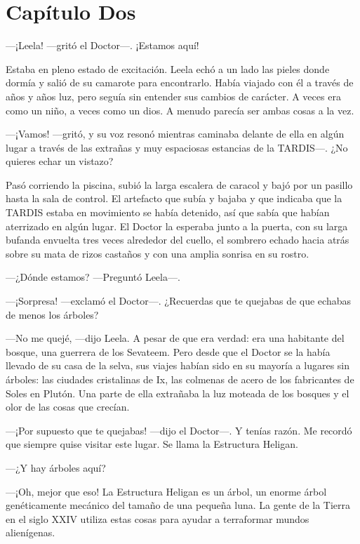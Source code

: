 \chapter*{Capítulo Dos}

---¡Leela! ---gritó el Doctor---. ¡Estamos aquí!

Estaba en pleno estado de excitación. Leela echó a un lado las pieles
donde dormía y salió de su camarote para encontrarlo. Había viajado con
él a través de años y años luz, pero seguía sin entender sus cambios de
carácter. A veces era como un niño, a veces como un dios. A menudo
parecía ser ambas cosas a la vez.

---¡Vamos! ---gritó, y su voz resonó mientras caminaba delante de ella
en algún lugar a través de las extrañas y muy espaciosas estancias de la
TARDIS---. ¿No quieres echar un vistazo?

Pasó corriendo la piscina, subió la larga escalera de caracol y bajó por
un pasillo hasta la sala de control. El artefacto que subía y bajaba y
que indicaba que la TARDIS estaba en movimiento se había detenido, así
que sabía que habían aterrizado en algún lugar. El Doctor la esperaba
junto a la puerta, con su larga bufanda envuelta tres veces alrededor
del cuello, el sombrero echado hacia atrás sobre su mata de rizos
castaños y con una amplia sonrisa en su rostro.

---¿Dónde estamos? ---Preguntó Leela---.

---¡Sorpresa! ---exclamó el Doctor---. ¿Recuerdas que te quejabas de que
echabas de menos los árboles?

---No me quejé, ---dijo Leela. A pesar de que era verdad: era una
habitante del bosque, una guerrera de los Sevateem. Pero desde que el
Doctor se la había llevado de su casa de la selva, sus viajes habían
sido en su mayoría a lugares sin árboles: las ciudades cristalinas de
Ix, las colmenas de acero de los fabricantes de Soles en Plutón. Una
parte de ella extrañaba la luz moteada de los bosques y el olor de las
cosas que crecían.

---¡Por supuesto que te quejabas! ---dijo el Doctor---. Y tenías razón.
Me recordó que siempre quise visitar este lugar. Se llama la Estructura
Heligan.

---¿Y hay árboles aquí?

---¡Oh, mejor que eso! La Estructura Heligan es un árbol, un enorme
árbol genéticamente mecánico del tamaño de una pequeña luna. La gente de
la Tierra en el siglo XXIV utiliza estas cosas para ayudar a terraformar
mundos alienígenas.

